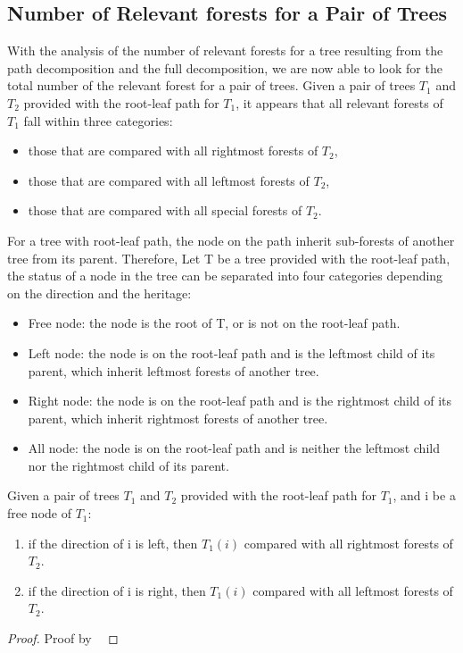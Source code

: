 \subsection{Number of Relevant forests for a Pair of Trees}
With the analysis of the number of relevant forests for a tree resulting from the path decomposition and the full decomposition, we are now able to look for the total number of the relevant forest for a pair of trees. Given a pair of trees $T_1$ and $T_2$ provided with the root-leaf path for $T_1$, it appears that all relevant forests of $T_1$ fall within three categories:
\begin{itemize}
\item those that are compared with all rightmost forests of $T_2$,
\item those that are compared with all leftmost forests of $T_2$,
\item those that are compared with all special forests of $T_2$.
\end{itemize} 

For a tree with root-leaf path, the node on the path inherit sub-forests of another tree from its parent. Therefore, Let T be a tree provided with the root-leaf path, the status of a node in the tree can be separated into four categories depending on the direction and the heritage:
\begin{itemize}
\item Free node: the node is the root of T, or is not on the root-leaf path.
\item Left node: the node is on the root-leaf path and is the leftmost child of its parent, which inherit leftmost forests of another tree.
\item Right node: the node is on the root-leaf path and is the rightmost child of its parent, which inherit rightmost forests of another tree.
\item All node: the node is on the root-leaf path and is neither the leftmost child nor the rightmost child of its parent.
\end{itemize}

\begin{lemma}
Given a pair of trees $T_1$ and $T_2$ provided with the root-leaf path for $T_1$, and i be a free node of $T_1$:
\begin{enumerate}
\item if the direction of i is left, then $T_1(i)$ compared with all rightmost forests of $T_2$.
\item if the direction of i is right, then $T_1(i)$ compared with all leftmost forests of $T_2$.
\end{enumerate}
\end{lemma}
\begin{proof}
Proof by ~\cite{dulucq2005decomposition}
\end{proof}

